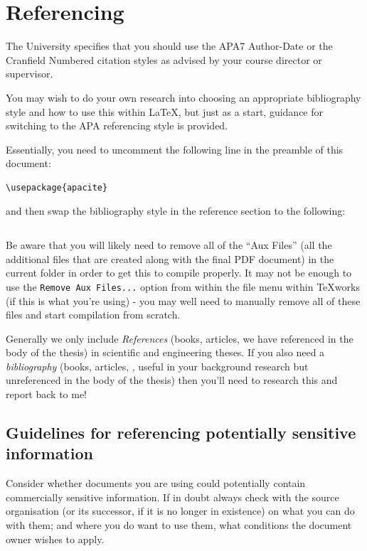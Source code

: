 \documentclass[12pt,oneside]{book} %
\begin{document}
\chapter{Referencing}
\label{chap:referencing}
The University specifies that you should use the APA7 Author-Date \cite{cranfieldlibraryserviceAPA7AuthorDateReferencing2024} or the Cranfield Numbered \cite{cranfielduniversitylibraryservicesNLMNumberedReferencing2023} citation styles as advised by your course director or supervisor. 

You may wish to do your own research into choosing an appropriate bibliography style and how to use this within \LaTeX, but just as a start, guidance for switching to the APA referencing style is provided.

Essentially, you need to uncomment the following line in the preamble of this document:
\begin{verbatim}
\usepackage{apacite}
\end{verbatim}
and then swap the bibliography style in the reference section to the following:
\begin{verbatim}

\end{verbatim}
Be aware that you will likely need to remove all of the ``Aux Files'' (all the additional files that are created along with the final PDF document) in the current folder in order to get this to compile properly. It may not be enough to use the \texttt{Remove Aux Files...} option from within the file menu within TeXworks (if this is what you're using) - you may well need to manually remove all of these files and start compilation from scratch.

Generally we only include {\em References} (books, articles, \etc we have referenced in the body of the thesis) in scientific and engineering theses. If you also need a {\em bibliography} (books, articles, \etc, useful in your background research but unreferenced in the body of the thesis) then you'll need to research this and report back to me! 

\section{Guidelines for referencing potentially sensitive information}\label{sec:SensitiveInformation}
Consider whether documents you are using could potentially contain commercially sensitive information. If in doubt always check with the source organisation (or its successor, if it is no longer in existence) on what you can do with them; and where you do want to use them, what conditions the document owner wishes to apply.
\end{document}

